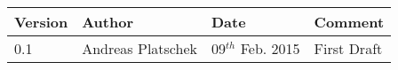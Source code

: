 
\begin{table}[h]
\begin{tabular*}{13.7cm}{|p{}|p{}|p{}|p{}|}
\hline Version & Author & Date & Comment \\
\hline 0.1 & Andreas Platschek & 09$^{th}$ Feb. 2015 & First Draft \\
\hline 
\end{tabular*}
\end{table}

